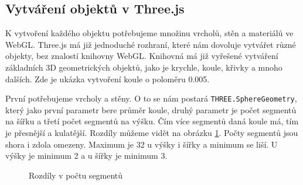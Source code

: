 \documentclass[czech,bachelor,dept420,male,cpdeclaration]{diploma}
\begin{document}
\subsection{Vytváření objektů v Three.js}\label{secref:secref6}
K vytvoření každého objektu potřebujeme množinu vrcholů, stěn a materiálů ve WebGL. Three.js má již jednoduché rozhraní, které nám dovoluje vytvářet různé objekty, bez znalostí knihovny WebGL. Knihovná má již vyřešené vytváření základních 3D geometrických objektů, jako je krychle, koule, křivky a mnoho dalších. Zde je ukázka vytvoření koule o poloměru \num{0,005}. 



První potřebujeme vrcholy a stěny. O to se nám postará \texttt{THREE.SphereGeometry}, který jako první parametr bere průměr koule, druhý parametr je počet segmentů na šířku a třetí počet segmentů na výšku. Čím více segmentů daná koule má, tím je přesnější a kulatější. Rozdíly můžeme vidět na obrázku \ref{fig:spheres}. Počty segmentů jsou shora i zdola omezeny. Maximum je \num{32} u výšky i šířky a minimum se liší. U výšky je minimum \num{2} a u šířky je minimum \num{3}.

\begin{figure}[H]
    \centering
    \qquad
    \caption{Rozdíly v počtu segmentů}%
    \label{fig:spheres}%
\end{figure}
\end{document}
